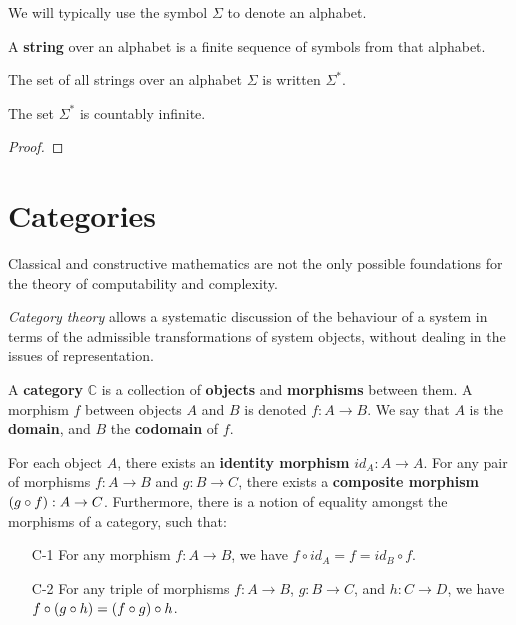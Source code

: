 \begin{notation} We will typically use the symbol $\Sigma$ to denote an
alphabet. \end{notation}

\begin{definition} A \textbf{string} over an alphabet is a finite sequence of
symbols from that alphabet. \end{definition}

\begin{definition} The set of all strings over an alphabet $\Sigma$ is written
$\Sigma^*$. \end{definition}

\begin{theorem} \label{thm:kleene-star-countably-infinite} The set $\Sigma^*$
is countably infinite. \end{theorem}

\begin{proof} \end{proof}

\section{Categories}

Classical and constructive mathematics are not the only possible foundations
for the theory of computability and complexity.

\emph{Category theory} allows a systematic discussion of the behaviour of a
system in terms of the admissible transformations of system objects, without
dealing in the issues of representation.

\begin{specification} A \textbf{category} $\mathbb{C}$ is a collection of
\textbf{objects} and \textbf{morphisms} between them. A morphism $f$ between
objects $A$ and $B$ is denoted $f:A\rightarrow B$. We say that $A$ is the
\textbf{domain}, and $B$ the \textbf{codomain} of $f$.

For each object $A$, there exists an \textbf{identity morphism}
$id_A:A\rightarrow A$. For any pair of morphisms $f : A\rightarrow B$ and $g :
B \rightarrow C$, there exists a \textbf{composite morphism} $\mathopen{}\left({g\circ f}\right)\mathclose{} : A
\rightarrow C$.  Furthermore, there is a notion of equality amongst the
morphisms of a category, such that:

\begin{enumerate}

\item [C-1] For any morphism $f:A\rightarrow B$, we have $f\circ id_A = f =
id_B \circ f$.

\item [C-2] For any triple of morphisms $f : A \rightarrow B$, $g : B
\rightarrow C$, and $h : C \rightarrow D$, we have $f\circ \mathopen{}\left({g \circ h}\right)\mathclose{} =
\mathopen{}\left({f\circ g}\right)\mathclose{} \circ h$.

\end{enumerate}

\end{specification}

